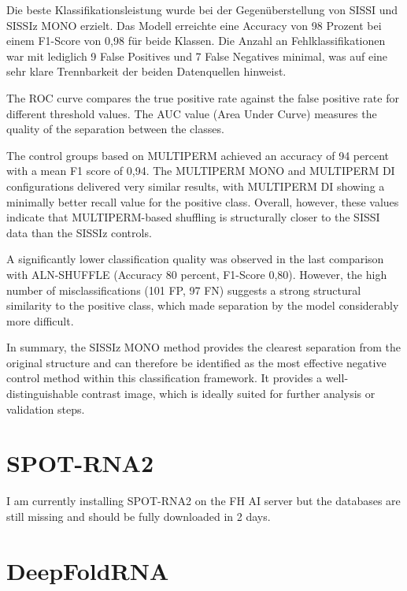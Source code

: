 \documentclass{article}
\begin{document}
\begin{large}
\begin{large}
\begin{large}
Die beste Klassifikationsleistung wurde bei der Gegenüberstellung von SISSI und SISSIz MONO erzielt. Das Modell erreichte eine Accuracy von 98 Prozent bei einem F1-Score von 0{,}98 für beide Klassen. Die Anzahl an Fehlklassifikationen war mit lediglich 9 False Positives und 7 False Negatives minimal, was auf eine sehr klare Trennbarkeit der beiden Datenquellen hinweist. \vspace{1em}

The ROC curve compares the true positive rate against the false positive rate for different threshold values. The AUC value (Area Under Curve) measures the quality of the separation between the classes. \vspace{1em}

The control groups based on MULTIPERM achieved an accuracy of 94 percent with a mean F1 score of 0{,}94. The MULTIPERM MONO and MULTIPERM DI configurations delivered very similar results, with MULTIPERM DI showing a minimally better recall value for the positive class. Overall, however, these values indicate that MULTIPERM-based shuffling is structurally closer to the SISSI data than the SISSIz controls. \vspace{1em}

A significantly lower classification quality was observed in the last comparison with ALN-SHUFFLE (Accuracy 80 percent, F1-Score 0{,}80). However, the high number of misclassifications (101 FP, 97 FN) suggests a strong structural similarity to the positive class, which made separation by the model considerably more difficult. \vspace{1em}

In summary, the SISSIz MONO method provides the clearest separation from the original structure and can therefore be identified as the most effective negative control method within this classification framework. It provides a well-distinguishable contrast image, which is ideally suited for further analysis or validation steps. \vspace{1em}

\clearpage

\section{SPOT-RNA2}
I am currently installing SPOT-RNA2 on the FH AI server but the databases are still missing and should be fully downloaded in 2 days.

\section{DeepFoldRNA}


\end{large}
\end{large}
\end{large}
\end{document}
